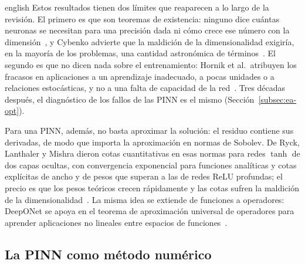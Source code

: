 \documentclass[../0000.tex]{subfiles}
\begin{document}
\begin{hyphenrules}{english}
Estos resultados tienen dos límites que reaparecen a lo largo de la revisión. El primero es que son teoremas de existencia: ninguno dice cuántas neuronas se necesitan para una precisión dada ni cómo crece ese número con la dimensión~\cite{hornik1989multilayer,leshno1993multilayer}, y Cybenko advierte que la maldición de la dimensionalidad exigiría, en la mayoría de los problemas, una cantidad astronómica de términos~\cite{cybenko1989approximation}. El segundo es que no dicen nada sobre el entrenamiento: Hornik et al.\ atribuyen los fracasos en aplicaciones a un aprendizaje inadecuado, a pocas unidades o a relaciones estocásticas, y no a una falta de capacidad de la red~\cite{hornik1989multilayer}. Tres décadas después, el diagnóstico de los fallos de las PINN es el mismo (Sección~\ref{subsec:ea-opt}).

Para una PINN, además, no basta aproximar la solución: el residuo contiene sus derivadas, de modo que importa la aproximación en normas de Sobolev. De Ryck, Lanthaler y Mishra dieron cotas cuantitativas en esas normas para redes $\tanh$ de dos capas ocultas, con convergencia exponencial para funciones analíticas y cotas explícitas de ancho y de pesos que superan a las de redes ReLU profundas; el precio es que los pesos teóricos crecen rápidamente y las cotas sufren la maldición de la dimensionalidad~\cite{de2021approximation}. La misma idea se extiende de funciones a operadores: DeepONet se apoya en el teorema de aproximación universal de operadores para aprender aplicaciones no lineales entre espacios de funciones~\cite{lu2019deeponet}.

\subsection{La PINN como método numérico}
\label{subsec:ea-numerico}


\end{hyphenrules}
\end{document}

